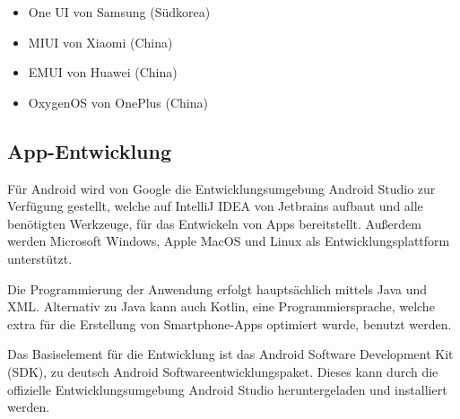 \begin{itemize}
  \item One UI von Samsung (Südkorea)
  \item MIUI von Xiaomi (China)
  \item EMUI von Huawei (China)
  \item OxygenOS von OnePlus (China)
\end{itemize}

\subsection{App-Entwicklung}
Für Android wird von Google die Entwicklungsumgebung Android Studio zur Verfügung gestellt, welche
auf IntelliJ IDEA von Jetbrains aufbaut und alle benötigten Werkzeuge, für das Entwickeln
von Apps bereitstellt. Außerdem werden Microsoft Windows, Apple MacOS und Linux als
Entwicklungsplattform unterstützt.

Die Programmierung der Anwendung erfolgt hauptsächlich mittels Java und XML. Alternativ zu Java kann
auch Kotlin, eine Programmiersprache, welche extra für die Erstellung von Smartphone-Apps optimiert
wurde, benutzt werden.

Das Basiselement für die Entwicklung ist das Android Software Development Kit (SDK), zu deutsch
Android Softwareentwicklungspaket. Dieses kann durch die offizielle Entwicklungsumgebung Android
Studio heruntergeladen und installiert werden.
